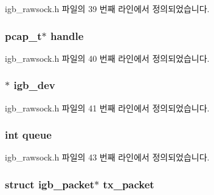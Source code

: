 igb\+\_\+rawsock.\+h 파일의 39 번째 라인에서 정의되었습니다.

\subsubsection[{\texorpdfstring{handle}{handle}}]{\setlength{\rightskip}{0pt plus 5cm}pcap\+\_\+t$\ast$ handle}\hypertarget{structigb__rawsock__t_a6c138155d7b3442efd19d0aa3f93e548}{}\label{structigb__rawsock__t_a6c138155d7b3442efd19d0aa3f93e548}


igb\+\_\+rawsock.\+h 파일의 40 번째 라인에서 정의되었습니다.

\subsubsection[{\texorpdfstring{igb\+\_\+dev}{igb_dev}}]{$\ast$ igb\+\_\+dev}\hypertarget{structigb__rawsock__t_a7b2a35a4e18e65c05ba807260a72444a}{}\label{structigb__rawsock__t_a7b2a35a4e18e65c05ba807260a72444a}


igb\+\_\+rawsock.\+h 파일의 41 번째 라인에서 정의되었습니다.

\subsubsection[{\texorpdfstring{queue}{queue}}]{\setlength{\rightskip}{0pt plus 5cm}int queue}\hypertarget{structigb__rawsock__t_a404442353660d7effc914ba8220ebf7f}{}\label{structigb__rawsock__t_a404442353660d7effc914ba8220ebf7f}


igb\+\_\+rawsock.\+h 파일의 43 번째 라인에서 정의되었습니다.

\subsubsection[{\texorpdfstring{tx\+\_\+packet}{tx_packet}}]{\setlength{\rightskip}{0pt plus 5cm}struct {\bf igb\+\_\+packet}$\ast$ tx\+\_\+packet}\hypertarget{structigb__rawsock__t_ade50152273d5aaf75ab880336c6333e3}{}\label{structigb__rawsock__t_ade50152273d5aaf75ab880336c6333e3}


